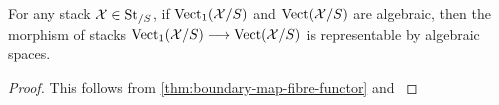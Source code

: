 \documentclass[11pt]{amsart}
\begin{document}
\begin{cor}
For any stack $\mathcal{X} \in \mathrm{St}_{/S}$, if $\mathrm{Vect}_1(\mathcal{X}/S)$ and $\mathrm{Vect}(\mathcal{X}/S)$
are algebraic, then the morphism of stacks
$\Vect_1(\mcX/S) \to \Vect(\mcX/S)$ is representable by algebraic spaces.
\end{cor}
\begin{proof}
This follows from \cref{thm:boundary-map-fibre-functor} and
\cite[\href{https://stacks.math.columbia.edu/tag/04Y5}{Lemma 04Y5}]
{stacks-project}
\end{proof}



\printbibliography
\end{document}
